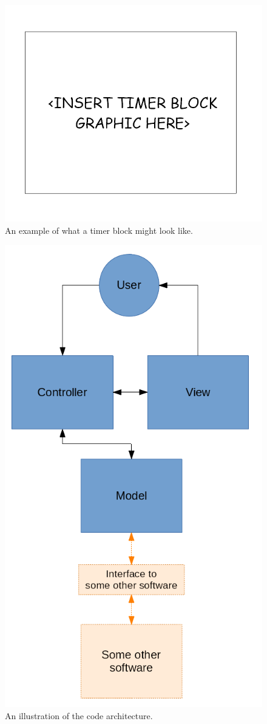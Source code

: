 \documentclass[11pt]{article} %
\begin{document}
\begin{figure}[h]
\centering
\includegraphics[scale=0.4]{block}
\caption{An example of what a timer block might look like.}
\label{fig:block}
\end{figure}

\begin{figure}[h]
\centering
\includegraphics[scale=0.5]{MVC}
\caption{An illustration of the code architecture.}
\label{fig:MVC}
\end{figure}
\end{document}

